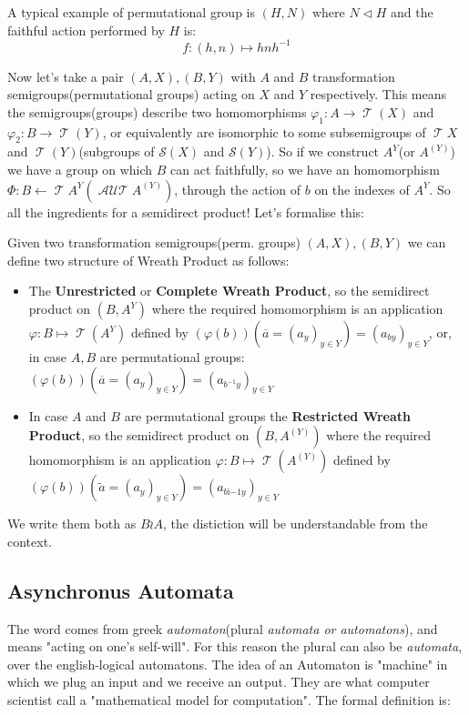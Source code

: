 \documentclass[mat1]{fmfdeloTS}
\DeclareMathOperator{\aut}{\mathcal{AUT}}
\DeclareMathOperator{\Tran}{\mathcal{T}}
\begin{document}
\begin{example}
A typical example of permutational group is $(H,N)$ where $N\triangleleft H$ and the faithful action performed by $H$ is:
$$f:(h,n)\longmapsto hnh^{-1}$$
\end{example}

Now let's take a pair $(A,X),(B,Y)$ with $A$ and $B$ transformation semigroups(permutational groups) acting on $X$ and $Y$ respectively. This means the semigroups(groups) describe two homomorphisms $\varphi_1:A\longrightarrow \Tran(X)$ and $\varphi_2:B\longrightarrow \Tran(Y)$, or equivalently are isomorphic to some subsemigroups of $\Tran{X}$ and $\Tran(Y)$(subgroups of $\mathcal{S}(X)$ and $\mathcal{S}(Y)$).
So if we construct $A^{Y}$(or $A^{(Y)}$) we have a group on which $B$ can act faithfully, so we have an homomorphism $\Phi : B\longleftarrow \Tran{A^Y} (\aut{A^{(Y)}})$, through the action of $b$ on the indexes of $A^Y$. So all the ingredients for a semidirect product! Let's formalise this:


\begin{definition}
Given two transformation semigroups(perm. groups) $(A,X),(B,Y)$ we can define two structure of Wreath Product as follows:
\begin{itemize}
\item The \textbf{Unrestricted} or \textbf{Complete Wreath Product}, so the semidirect product on $(B,A^{Y})$ where the required homomorphism is an application $\varphi:B\longmapsto \Tran(A^Y)$ defined by $(\varphi(b))(\overline{a}=(a_y)_{y\in Y})=(a_{by})_{y\in Y} $, or, in case $A,B$ are permutational groups: $(\varphi(b))(\overline{a}=(a_y)_{y\in Y})=(a_{b^{-1}y})_{y\in Y}$
\item In case $A$ and $B$ are permutational groups the \textbf{Restricted Wreath Product}, so the semidirect product on $(B,A^{(Y)})$ where the required homomorphism is an application $\varphi:B\longmapsto \Tran(A^{(Y)})$ defined by $(\varphi(b))(\widetilde a=(a_y)_{y\in Y})=(a_{bì{-1}y})_{y\in Y} $
\end{itemize}
We write them both as $B\wr A$, the distiction will be understandable from the context.
\end{definition}



\subsection{Asynchronus Automata}
The word comes from greek \textit{automaton}(plural \textit{automata \textit{or} automatons}), and means "acting on one's self-will". For this reason the plural can also be \textit{automata}, over the english-logical automatons.
The idea of an Automaton is "machine" in which we plug an input and we receive an output. They are what computer scientist call a "mathematical model for computation". The formal definition is:
\end{document}
